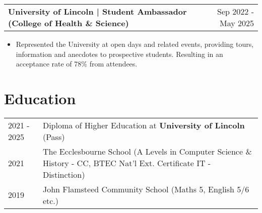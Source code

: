 \documentclass[a4paper,12pt]{article}
\makeatletter
\newenvironment{joblong}[2]
    {
    \begin{tabularx}{\linewidth}{@{}l X r@{}}
    \textbf{#1} & \hfill &  #2 \\[3.75pt]
    \end{tabularx}
    \begin{minipage}[t]{\linewidth}
    \begin{itemize}[nosep,after=\strut, leftmargin=1em, itemsep=3pt,label=--]
    }
    {
    \end{itemize}
    \end{minipage}    
    }
\makeatother
\begin{document}
\begin{joblong}{University of Lincoln | Student Ambassador (College of Health \& Science)}{Sep 2022 - May 2025}
\item Represented the University at open days and related events, providing tours, information and anecdotes to prospective students. Resulting in an acceptance rate of 78\% from attendees.
\end{joblong}



\section{Education}
\begin{tabularx}{\linewidth}{@{}l X@{}}	
2021 - 2025 & Diploma of Higher Education at \textbf{University of Lincoln} \hfill (Pass) \\ 

2021 & The Ecclesbourne School  (A Levels in Computer Science \& History - CC, BTEC Nat'l Ext. Certificate IT - Distinction) \\

2019 & John Flamsteed Community School \hfill  (Maths 5, English 5/6 etc.) \\
\end{tabularx}

\end{document}
